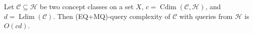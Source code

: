 \documentclass[runningheads]{llncs}
\newcommand{\mc}{\mathcal}
\DeclareMathOperator{\Ldim}{Ldim}
\DeclareMathOperator{\Cdim}{Cdim}
\DeclareMathOperator{\SCdim}{SCdim}
\begin{document}


\begin{theorem}
\label{thm:query complexity bounds}
Let $\mc C \subseteq \mc H$ be two concept classes on a set $X$, $c = \Cdim(\mc C, \mc H)$, and $d = \Ldim(\mc C)$.
Then (EQ+MQ)-query complexity of $\mc C$ with queries from $\mc H$ is $O(cd)$. 
\end{theorem}
\end{document}
